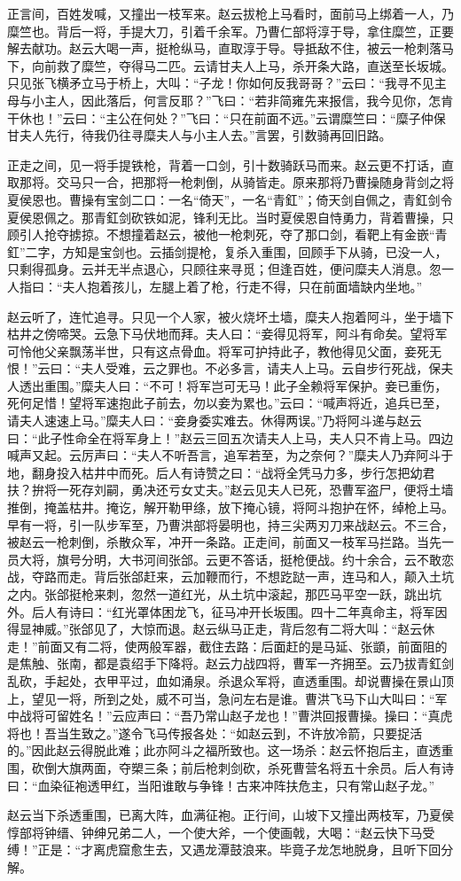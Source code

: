 正言间，百姓发喊，又撞出一枝军来。赵云拔枪上马看时，面前马上绑着一人，乃糜竺也。背后一将，手提大刀，引着千余军。乃曹仁部将淳于导，拿住糜竺，正要解去献功。赵云大喝一声，挺枪纵马，直取淳于导。导抵敌不住，被云一枪刺落马下，向前救了糜竺，夺得马二匹。云请甘夫人上马，杀开条大路，直送至长坂城。只见张飞横矛立马于桥上，大叫：“子龙！你如何反我哥哥？”云曰：“我寻不见主母与小主人，因此落后，何言反耶？”飞曰：“若非简雍先来报信，我今见你，怎肯干休也！”云曰：“主公在何处？”飞曰：“只在前面不远。”云谓糜竺曰：“糜子仲保甘夫人先行，待我仍往寻糜夫人与小主人去。”言罢，引数骑再回旧路。

正走之间，见一将手提铁枪，背着一口剑，引十数骑跃马而来。赵云更不打话，直取那将。交马只一合，把那将一枪刺倒，从骑皆走。原来那将乃曹操随身背剑之将夏侯恩也。曹操有宝剑二口：一名“倚天”，一名“青釭”；倚天剑自佩之，青釭剑令夏侯恩佩之。那青釭剑砍铁如泥，锋利无比。当时夏侯恩自恃勇力，背着曹操，只顾引人抢夺掳掠。不想撞着赵云，被他一枪刺死，夺了那口剑，看靶上有金嵌“青釭”二字，方知是宝剑也。云插剑提枪，复杀入重围，回顾手下从骑，已没一人，只剩得孤身。云并无半点退心，只顾往来寻觅；但逢百姓，便问糜夫人消息。忽一人指曰：“夫人抱着孩儿，左腿上着了枪，行走不得，只在前面墙缺内坐地。”

赵云听了，连忙追寻。只见一个人家，被火烧坏土墙，糜夫人抱着阿斗，坐于墙下枯井之傍啼哭。云急下马伏地而拜。夫人曰：“妾得见将军，阿斗有命矣。望将军可怜他父亲飘荡半世，只有这点骨血。将军可护持此子，教他得见父面，妾死无恨！”云曰：“夫人受难，云之罪也。不必多言，请夫人上马。云自步行死战，保夫人透出重围。”糜夫人曰：“不可！将军岂可无马！此子全赖将军保护。妾已重伤，死何足惜！望将军速抱此子前去，勿以妾为累也。”云曰：“喊声将近，追兵已至，请夫人速速上马。”糜夫人曰：“妾身委实难去。休得两误。”乃将阿斗递与赵云曰：“此子性命全在将军身上！”赵云三回五次请夫人上马，夫人只不肯上马。四边喊声又起。云厉声曰：“夫人不听吾言，追军若至，为之奈何？”糜夫人乃弃阿斗于地，翻身投入枯井中而死。后人有诗赞之曰：“战将全凭马力多，步行怎把幼君扶？拚将一死存刘嗣，勇决还亏女丈夫。”赵云见夫人已死，恐曹军盗尸，便将土墙推倒，掩盖枯井。掩讫，解开勒甲绦，放下掩心镜，将阿斗抱护在怀，绰枪上马。早有一将，引一队步军至，乃曹洪部将晏明也，持三尖两刃刀来战赵云。不三合，被赵云一枪刺倒，杀散众军，冲开一条路。正走间，前面又一枝军马拦路。当先一员大将，旗号分明，大书河间张郃。云更不答话，挺枪便战。约十余合，云不敢恋战，夺路而走。背后张郃赶来，云加鞭而行，不想趷跶一声，连马和人，颠入土坑之内。张郃挺枪来刺，忽然一道红光，从土坑中滚起，那匹马平空一跃，跳出坑外。后人有诗曰：“红光罩体困龙飞，征马冲开长坂围。四十二年真命主，将军因得显神威。”张郃见了，大惊而退。赵云纵马正走，背后忽有二将大叫：“赵云休走！”前面又有二将，使两般军器，截住去路：后面赶的是马延、张顗，前面阻的是焦触、张南，都是袁绍手下降将。赵云力战四将，曹军一齐拥至。云乃拔青釭剑乱砍，手起处，衣甲平过，血如涌泉。杀退众军将，直透重围。却说曹操在景山顶上，望见一将，所到之处，威不可当，急问左右是谁。曹洪飞马下山大叫曰：“军中战将可留姓名！”云应声曰：“吾乃常山赵子龙也！”曹洪回报曹操。操曰：“真虎将也！吾当生致之。”遂令飞马传报各处：“如赵云到，不许放冷箭，只要捉活的。”因此赵云得脱此难；此亦阿斗之福所致也。这一场杀：赵云怀抱后主，直透重围，砍倒大旗两面，夺槊三条；前后枪刺剑砍，杀死曹营名将五十余员。后人有诗曰：“血染征袍透甲红，当阳谁敢与争锋！古来冲阵扶危主，只有常山赵子龙。”

赵云当下杀透重围，已离大阵，血满征袍。正行间，山坡下又撞出两枝军，乃夏侯惇部将钟缙、钟绅兄弟二人，一个使大斧，一个使画戟，大喝：“赵云快下马受缚！”正是：“才离虎窟愈生去，又遇龙潭鼓浪来。毕竟子龙怎地脱身，且听下回分解。